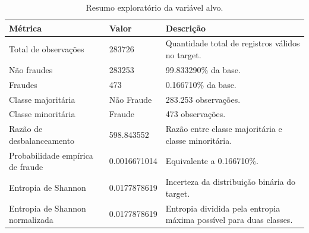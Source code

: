 \begin{table}
\caption{Resumo exploratório da variável alvo.}
\label{tab:resumo-target}
\begin{tabular}{lll}
\toprule
Métrica & Valor & Descrição \\
\midrule
Total de observações & 283726 & Quantidade total de registros válidos no target. \\
Não fraudes & 283253 & 99.833290\% da base. \\
Fraudes & 473 & 0.166710\% da base. \\
Classe majoritária & Não Fraude & 283.253 observações. \\
Classe minoritária & Fraude & 473 observações. \\
Razão de desbalanceamento & 598.843552 & Razão entre classe majoritária e classe minoritária. \\
Probabilidade empírica de fraude & 0.0016671014 & Equivalente a 0.166710\%. \\
Entropia de Shannon & 0.0177878619 & Incerteza da distribuição binária do target. \\
Entropia de Shannon normalizada & 0.0177878619 & Entropia dividida pela entropia máxima possível para duas classes. \\
\bottomrule
\end{tabular}
\end{table}
